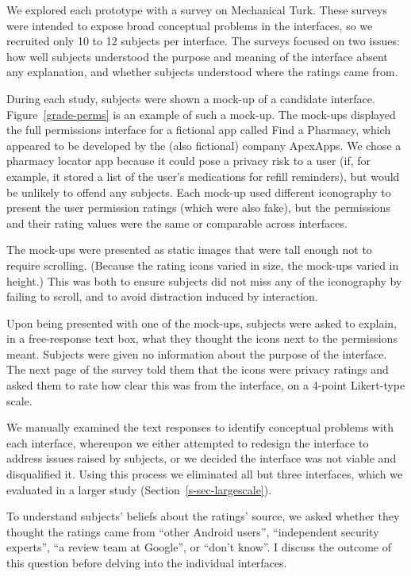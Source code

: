 \documentclass[11pt]{article}
\newcommand{\reffig}[1]{Figure~\ref{#1}}
\newcommand{\refsec}[1]{Section~\ref{#1}}
\begin{document}
We explored each prototype with a survey on Mechanical Turk.
These surveys were 
intended to expose broad conceptual problems 
in the interfaces, so we recruited only 10 to 12 
subjects per interface. The surveys focused on two issues: how well subjects 
understood the purpose and meaning of the interface absent any explanation, 
and whether subjects understood where the ratings came from.

During each study, subjects were shown a mock-up of
a candidate interface. \reffig{grade-perms}
is an example of such a mock-up. The mock-ups displayed the full permissions
interface for a fictional app called Find a Pharmacy, which appeared 
to be developed by the (also fictional) company ApexApps. 
We chose a pharmacy locator app because it 
could pose a privacy risk to a user (if, for example, it stored a list
of the user's medications for refill reminders), but 
would be unlikely to offend any 
subjects. Each mock-up used different iconography to
present the user permission ratings (which were also fake), but the permissions
and their rating values were the same or comparable across interfaces. 

The mock-ups were presented as static images that were tall enough
not to require scrolling. (Because the rating icons
varied in size, the mock-ups varied in height.) This was both
to ensure subjects did not miss any of the iconography by failing to
scroll, and to avoid distraction induced by interaction.

Upon being presented with one of the mock-ups, subjects were
asked to explain, in a free-response text box, 
what they thought the icons next to the permissions 
meant. Subjects were given no information about the 
purpose of the interface. The next page of the survey 
told them that the icons were privacy 
ratings and asked them to rate how clear this was from 
the interface, on a 4-point Likert-type scale. 

We manually examined 
the text responses to identify conceptual problems with each 
interface, whereupon we either attempted 
to redesign the interface to address issues raised by subjects, 
or we decided the interface was not viable and disqualified it.
Using this process we eliminated all but three interfaces, which we evaluated
in a larger study (\refsec{s-sec-largescale}).

To understand subjects' beliefs about the ratings' source, we asked
whether they thought the ratings came from 
 ``other Android users'', ``independent 
security experts'', ``a review team at Google'', or
``don't know''. I discuss the outcome of this question
before delving into the individual interfaces.
\end{document}
